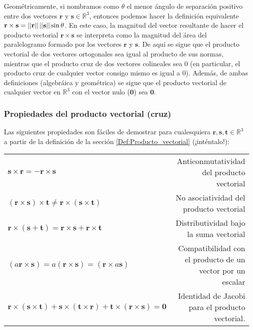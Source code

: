 Geométricamente, si nombramos como $\theta$ el menor ángulo de separación positivo entre dos vectores $\mathbf{r}$ y $\mathbf{s}\in\mathbb{R}^3$, entonces podemos hacer la definición equivalente $\mathbf{r}\times\mathbf{s}=||\mathbf{r}|| \hspace{0.5mm}  ||\mathbf{s}||\sin\theta$. En este caso, la magnitud del vector resultante de hacer el producto vectorial $\mathbf{r}\times\mathbf{s}$ se interpreta como la magnitud del área del paralelogramo formado por los vectores $\mathbf{r}$ y $\mathbf{s}$. De aquí se sigue que el producto vectorial de dos vectores ortogonales sea igual al producto de sus normas, mientras que el producto cruz de dos vectores colineales sea $0$ (en particular, el producto cruz de cualquier vector consigo mismo es igual a $0$). Además, de ambas definiciones (algebráica y geométrica) se sigue que el producto vectorial de cualquier vector en $\mathbb{R}^3$ con el vector nulo ($\mathbf{0}$) sea $\mathbf{0}$.

\subsubsection{Propiedades del producto vectorial (cruz)} \label{Prop:Producto_vectorial}

Las siguientes propiedades son fáciles de demostrar para cualesquiera $\mathbf{r},\mathbf{s},\mathbf{t}\in\mathbb{R}^3$ a partir de la definición de la sección \ref{Def:Producto_vectorial} (¡inténtalo!):

\begin{center}
\begin{tabular}{lr}
    $\mathbf{s}\times\mathbf{r} = -\mathbf{r}\times\mathbf{s}$ & Anticonmutatividad del producto vectorial \\
    $(\mathbf{r}\times\mathbf{s})\times\mathbf{t}\neq\mathbf{r}\times(\mathbf{s}\times\mathbf{t})$ & No asociatividad del producto vectorial \\
    $\mathbf{r}\times(\mathbf{s}+\mathbf{t}) = \mathbf{r}\times\mathbf{s}+\mathbf{r}\times\mathbf{t}$ & Distributividad bajo la suma vectorial \\
    $(a\mathbf{r}\times\mathbf{s}) = a(\mathbf{r}\times\mathbf{s})=(\mathbf{r}\times a\mathbf{s})$ & Compatibilidad con el producto de un vector por un escalar\\
    $\mathbf{r}\times(\mathbf{s}\times\mathbf{t})+\mathbf{s}\times(\mathbf{t}\times\mathbf{r})+\mathbf{t}\times(\mathbf{r}\times\mathbf{s}) = \mathbf{0}$ & Identidad de Jacobi para el producto vectorial.
\end{tabular}
\end{center}




